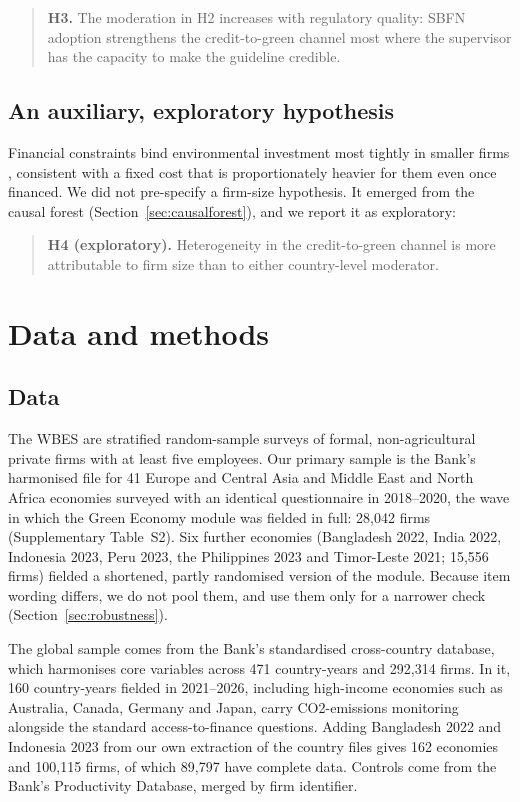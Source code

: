 \documentclass[review,authoryear,12pt]{elsarticle}
\begin{document}
\begin{quotation}
\noindent\textbf{H3.} The moderation in H2 increases with regulatory quality: SBFN adoption strengthens the credit-to-green channel most where the supervisor has the capacity to make the guideline credible.
\end{quotation}

\subsection{An auxiliary, exploratory hypothesis}
\label{sec:h4}

Financial constraints bind environmental investment most tightly in smaller firms \citep{ullah2025}, consistent with a fixed cost that is proportionately heavier for them even once financed. We did not pre-specify a firm-size hypothesis. It emerged from the causal forest (Section~\ref{sec:causalforest}), and we report it as exploratory:

\begin{quotation}
\noindent\textbf{H4 (exploratory).} Heterogeneity in the credit-to-green channel is more attributable to firm size than to either country-level moderator.
\end{quotation}

\section{Data and methods}
\label{sec:methodology}

\subsection{Data}

The WBES are stratified random-sample surveys of formal, non-agricultural private firms with at least five employees. Our primary sample is the Bank's harmonised file for 41 Europe and Central Asia and Middle East and North Africa economies surveyed with an identical questionnaire in 2018--2020, the wave in which the Green Economy module was fielded in full: 28{,}042 firms (Supplementary Table~S2). Six further economies (Bangladesh 2022, India 2022, Indonesia 2023, Peru 2023, the Philippines 2023 and Timor-Leste 2021; 15{,}556 firms) fielded a shortened, partly randomised version of the module. Because item wording differs, we do not pool them, and use them only for a narrower check (Section~\ref{sec:robustness}).

The global sample comes from the Bank's standardised cross-country database, which harmonises core variables across 471 country-years and 292{,}314 firms. In it, 160 country-years fielded in 2021--2026, including high-income economies such as Australia, Canada, Germany and Japan, carry CO2-emissions monitoring alongside the standard access-to-finance questions. Adding Bangladesh 2022 and Indonesia 2023 from our own extraction of the country files gives 162 economies and 100{,}115 firms, of which 89{,}797 have complete data. Controls come from the Bank's Productivity Database, merged by firm identifier.
\end{document}
